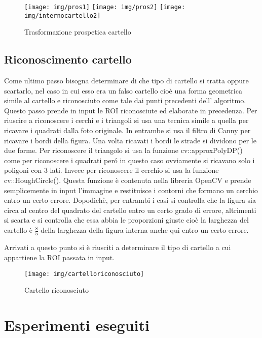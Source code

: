 	\begin{figure}[!ht]
		\centering
		\texttt{[image: img/pros1]}
		\texttt{[image: img/pros2]}
		\texttt{[image: img/internocartello2]}
		\caption{Trasformazione prospetica cartello}
	\end{figure}

\subsection{Riconoscimento cartello}

	Come ultimo passo bisogna determinare di che tipo di cartello si tratta oppure scartarlo, nel caso in cui esso era un falso cartello cioè una forma geometrica simile al cartello e riconosciuto come tale dai punti precedenti dell' algoritmo. Questo passo prende in input le ROI riconosciute ed elaborate in precedenza. Per riuscire a riconoscere i cerchi e i triangoli si usa una tecnica simile a quella per ricavare i quadrati dalla foto originale. In entrambe si usa il filtro di Canny per ricavare i bordi della figura. Una volta ricavati i bordi le strade si dividono per le due forme. Per riconoscere il triangolo si usa la funzione cv::approxPolyDP() come per riconoscere i quadrati per\'o in questo caso ovviamente si ricavano solo i poligoni con 3 lati. Invece per riconoscere il cerchio si usa la funzione cv::HoughCircle(). Questa funzione è contenuta nella libreria OpenCV e prende semplicemente in input l'immagine e restituisce i contorni che formano un cerchio entro un certo errore. Dopodichè, per entrambi i casi si controlla che la figura sia circa al centro del quadrato del cartello entro un certo grado di errore, altrimenti si scarta e si controlla che essa abbia le proporzioni giuste cioè la larghezza del cartello è $\frac{8}{5}$ della larghezza della figura interna anche qui entro un certo errore.

	Arrivati a questo punto si è riusciti a determinare il tipo di cartello a cui appartiene la ROI passata in input. 
	\begin{figure}[!ht]
		\centering
		\texttt{[image: img/cartelloriconosciuto]}
		\caption{Cartello riconosciuto}
	\end{figure}

\section{Esperimenti eseguiti}

